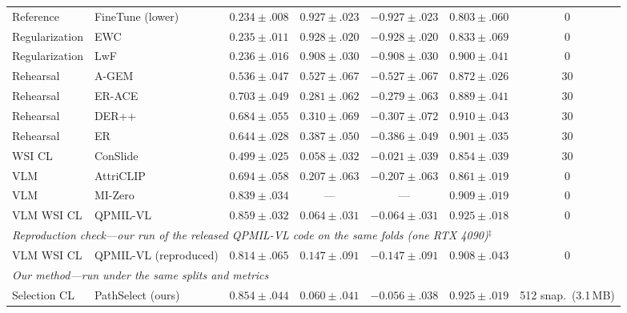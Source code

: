 \documentclass{article}
\begin{document}
\begin{table}[t]
\begin{tabular}{llccccc}
Reference & FineTune (lower) & $0.234{\pm}.008$ & $0.927{\pm}.023$ & $-0.927{\pm}.023$ & $0.803{\pm}.060$ & 0 \\
Regularization & EWC \cite{kirkpatrick2017ewc} & $0.235{\pm}.011$ & $0.928{\pm}.020$ & $-0.928{\pm}.020$ & $0.833{\pm}.069$ & 0 \\
Regularization & LwF \cite{li2017lwf} & $0.236{\pm}.016$ & $0.908{\pm}.030$ & $-0.908{\pm}.030$ & $0.900{\pm}.041$ & 0 \\
Rehearsal & A-GEM \cite{chaudhry2019agem} & $0.536{\pm}.047$ & $0.527{\pm}.067$ & $-0.527{\pm}.067$ & $0.872{\pm}.026$ & 30 \\
Rehearsal & ER-ACE \cite{caccia2022erace} & $0.703{\pm}.049$ & $0.281{\pm}.062$ & $-0.279{\pm}.063$ & $0.889{\pm}.041$ & 30 \\
Rehearsal & DER++ \cite{buzzega2020derpp} & $0.684{\pm}.055$ & $0.310{\pm}.069$ & $-0.307{\pm}.072$ & $0.910{\pm}.043$ & 30 \\
Rehearsal & ER \cite{chaudhry2019er} & $0.644{\pm}.028$ & $0.387{\pm}.050$ & $-0.386{\pm}.049$ & $0.901{\pm}.035$ & 30 \\
WSI CL & ConSlide \cite{huang2023conslide} & $0.499{\pm}.025$ & $0.058{\pm}.032$ & $-0.021{\pm}.039$ & $0.854{\pm}.039$ & 30 \\
VLM & AttriCLIP \cite{wang2023attriclip} & $0.694{\pm}.058$ & $0.207{\pm}.063$ & $-0.207{\pm}.063$ & $0.861{\pm}.019$ & 0 \\
VLM & MI-Zero \cite{lu2023mizero} & $0.839{\pm}.034$ & --- & --- & $0.909{\pm}.019$ & 0 \\
VLM WSI CL & QPMIL-VL \cite{gou2025qpmil} & $0.859{\pm}.032$ & $0.064{\pm}.031$ & $-0.064{\pm}.031$ & $0.925{\pm}.018$ & 0 \\
\midrule
\multicolumn{7}{l}{\emph{Reproduction check---our run of the released QPMIL-VL code on the same folds (one RTX 4090)$^\ddagger$}} \\
VLM WSI CL & QPMIL-VL (reproduced) & $0.814{\pm}.065$ & $0.147{\pm}.091$ & $-0.147{\pm}.091$ & $0.908{\pm}.043$ & 0 \\
\midrule
\multicolumn{7}{l}{\emph{Our method---run under the same splits and metrics}} \\
Selection CL & PathSelect (ours) & $0.854{\pm}.044$ & $0.060{\pm}.041$ & $-0.056{\pm}.038$ & $0.925{\pm}.019$ & 512 snap.\ (3.1\,MB) \\
\bottomrule
\end{tabular}
\end{table}
\end{document}
